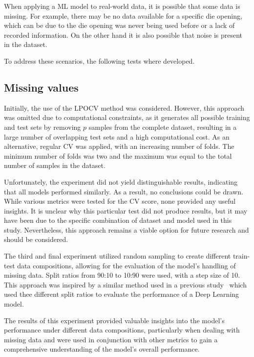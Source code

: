 When applying a \ac{ML} model to real-world data, it is possible that some data is missing.
For example, there may be no data available for a specific die opening, which can be due to the die opening
was never being used before or a lack of recorded information.
On the other hand it is also possible that noise is present in the dataset.

To address these scenarios, the following tests where developed.

\subsection{Missing values}

Initially, the use of the \ac{LPOCV} method was considered.
However, this approach was omitted due to computational constraints, as it generates all possible
training and test sets by removing $p$ samples from the complete dataset, resulting in a large
number of overlapping test sets and a high computational cost.
As an alternative, regular CV was applied, with an increasing number of folds.
The minimum number of folds was two and the maximum was equal to the total number of samples in the
dataset.

Unfortunately, the experiment did not yield distinguishable results, indicating that all models performed similarly.
As a result, no conclusions could be drawn.
While various metrics were tested for the CV score, none provided any useful insights.
It is unclear why this particular test did not produce results, but it may have been due to the specific combination
of dataset and model used in this study.
Nevertheless, this approach remains a viable option for future research and should be considered.

The third and final experiment utilized random sampling to create different train-test data compositions, allowing
for the evaluation of the model's handling of missing data.
Split ratios from 90:10 to 10:90 were used, with a step size of 10.
This approach was inspired by a similar method used in a previous study~\cite[p. 570--574]{liu2021deep}  which used
thee different split ratios to evaluate the performance of a Deep Learning model.

The results of this experiment provided valuable insights into the model's performance under
different data compositions, particularly when dealing with missing
data and were used in conjunction with other metrics to gain a comprehensive understanding of
the model's overall performance.

